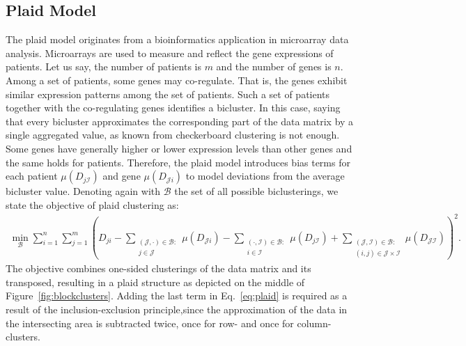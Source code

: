 \subsection{Plaid Model}
The plaid model originates from a bioinformatics application in microarray data analysis. Microarrays are used to measure and reflect the gene expressions of patients. Let us say, the number of patients is $m$ and the number of genes is $n$. Among a set of patients, some genes may co-regulate. That is, the genes exhibit similar expression patterns among the set of patients. Such a set of patients together with the co-regulating genes identifies a bicluster. In this case, saying that every bicluster approximates the corresponding part of the data matrix by a single aggregated value, as known from checkerboard clustering is not enough. Some genes have generally higher or lower expression levels than other genes and the same holds for patients. Therefore, the plaid model introduces bias terms for each patient $\mu(D_{j\mathcal{I}})$ and gene $\mu(D_{\mathcal{J}i})$ to model deviations from the average bicluster value. Denoting again with $\mathcal{B}$ the set of all possible biclusterings, we state the objective of plaid clustering as:
\begin{align}
   \min_{\mathcal{B}} \sum_{i=1}^n\sum_{j=1}^m \left(D_{ji}-\sum_{\substack{(\mathcal{J},\cdot)\in\mathcal{B}:\\  j\in\mathcal{J}}}\mu(D_{\mathcal{J}i}) - \sum_{\substack{(\cdot,\mathcal{I})\in\mathcal{B}:\\  i\in\mathcal{I}}} \mu(D_{j\mathcal{I}})+ \sum_{\substack{(\mathcal{J},\mathcal{I})\in\mathcal{B}:\\  (i,j)\in\mathcal{J}\times\mathcal{I}}} \mu(D_{\mathcal{JI}})\right)^2. \label{eq:plaid}
\end{align}
The objective combines one-sided clusterings of the data matrix and its transposed, resulting in a plaid structure as depicted on the middle of Figure~\ref{fig:blockclusters}. Adding the last term in Eq.~\eqref{eq:plaid} is required as a result of the inclusion-exclusion principle,since the approximation of the data in the intersecting area is subtracted twice, once for row- and once for column- clusters. 

